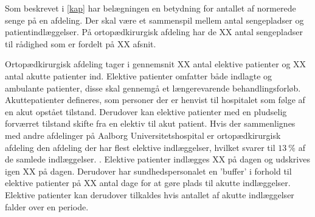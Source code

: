 Som beskrevet i \ref{kap} har belægningen en betydning for antallet af normerede senge på en afdeling. Der skal være et sammenspil mellem antal sengepladser og patientindlæggelser. På ortopædkirurgisk afdeling har de XX antal sengepladser til rådighed som er fordelt på XX afsnit. 


Ortopædkirurgisk afdeling tager i gennemsnit XX antal elektive patienter og XX antal akutte patienter ind. Elektive patienter omfatter både indlagte og ambulante patienter, disse skal gennemgå et længerevarende behandlingsforløb. Akuttepatienter defineres, som personer der er henvist til hospitalet som følge af en akut opstået tilstand. Derudover kan elektive patienter med en pludselig forværret tilstand skifte fra en elektiv til akut patient. 
Hvis der sammenlignes med andre afdelinger på Aalborg Universitetshospital er ortopædkirurgisk afdeling den afdeling der har flest elektive indlæggelser, hvilket svarer til $13~\%$ af de samlede indlæggelser. \cite{RegionNord2016}. Elektive patienter indlægges XX på dagen og udskrives igen XX på dagen. Derudover har sundhedspersonalet en 'buffer' i forhold til elektive patienter på XX antal dage for at gøre plads til akutte indlæggelser. Elektive patienter kan derudover tilkaldes hvis antallet af akutte indlæggelser falder over en periode. 